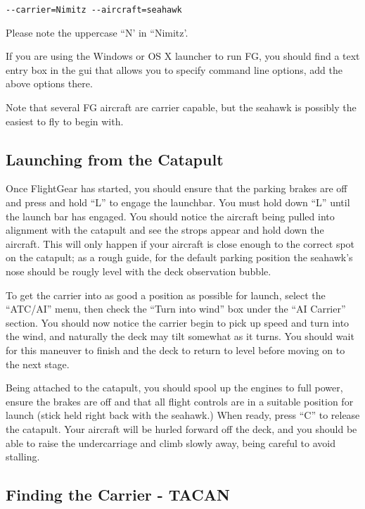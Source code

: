 \begin{verbatim}
--carrier=Nimitz --aircraft=seahawk
\end{verbatim}

Please note the uppercase ``N' in ``Nimitz'.

If you are using the Windows or OS X launcher to run FG, you should find a text entry box in the gui that
allows you to specify command line options, add the above options there.

Note that several FG aircraft are carrier capable, but the seahawk is possibly the easiest to fly to begin with.

\subsection{Launching from the Catapult}

Once FlightGear has started, you should ensure that the parking brakes are off and press and hold ``L'' to
engage the launchbar. You must hold down ``L'' until the launch bar has engaged.
You should notice the aircraft being pulled into alignment with the catapult and see
the strops appear and hold down the aircraft.  This will only happen if your aircraft is
close enough to the correct spot on the catapult; as a rough guide, for the default
parking position the seahawk's nose should be rougly level with the deck observation bubble.

To get the carrier into as good a position as possible for launch, select the ``ATC/AI'' menu, then
check the ``Turn into wind'' box under the ``AI Carrier'' section. You should now notice the carrier
begin to pick up speed and turn into the wind, and naturally the deck may tilt somewhat as it turns.
You should wait for this maneuver to finish and the deck to return to level before moving on to the next stage.

Being attached to the catapult, you should spool up the engines to full power, ensure the brakes are off
and that all flight controls are in a suitable position for launch (stick held right back with the seahawk.)
When ready, press ``C'' to release the catapult. Your aircraft will be hurled forward off the deck, and
you should be able to raise the undercarriage and climb slowly away, being careful to avoid stalling.

\subsection{Finding the Carrier - TACAN}

